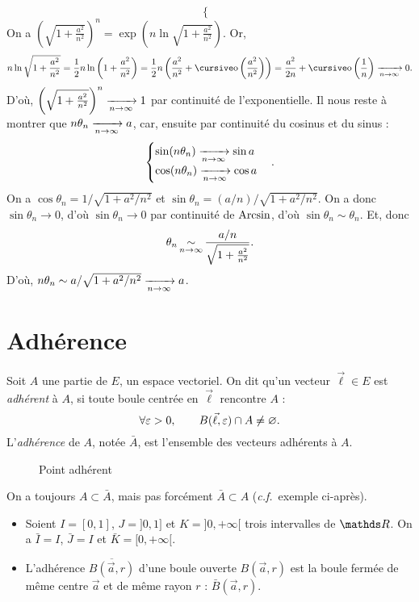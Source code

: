 \begin{exo}
\[\begin{cases}
		\end{cases}
	\]
	On a $\left( \sqrt{1 + \frac{a^2}{n^2}} \right)^n = \exp\left( n \ln \sqrt{1 + \frac{a^2}{n^2}} \right)$.
	Or, \[
		n \ln \sqrt{1 + \frac{a^2}{n^2}}  = \frac{1}{2} n \ln \left(1 + \frac{a^2}{n^2}\right) = \frac{1}{2}n\left( \frac{a^2}{n^2} + \po\left( \frac{a^2}{n^2} \right)\right) = \frac{a^2}{2n} + \po\left( \frac{1}{n} \right) \tendsto{n\to \infty} 0
	.\] D'où, $\left( \sqrt{1 + \frac{a^2}{n^2}}\right)^n \xrightarrow[n\to \infty]{} 1$\/ par continuité de l'exponentielle.
	Il nous reste à montrer que $n \theta_n \xrightarrow[n\to \infty]{} a$, car, ensuite par continuité du cosinus et du sinus : \[
		\begin{cases}
			\sin(n \theta_n) \xrightarrow[n\to \infty]{} \sin a\\
			\cos (n \theta_n) \xrightarrow[n\to \infty]{} \cos a
		\end{cases}
	.\]
	On a $\cos \theta_n = 1 / \sqrt{1 + a^2 / n^2}$\/ et $\sin \theta_n = (a / n) / \sqrt{1 + a^2 / n^2}$. On a donc $\sin \theta_n \to 0$, d'où $\sin \theta_n \to 0$\/ par continuité de $\operatorname{Arcsin}$, d'où $\sin \theta_n \sim \theta_n$.
	Et, donc \[
		\theta_n \operatorname*{\sim}_{n\to \infty} \frac{a/n}{\sqrt{1 + \frac{a^2}{n^2}}}
	.\] D'où, $n \theta_n \sim a / \sqrt{1 + a^2 / n^2} \xrightarrow[n\to \infty]{} a$.
\end{exo}

\section{Adhérence}

\begin{defn}
	Soit $A$\/ une partie de $E$, un espace vectoriel. On dit qu'un vecteur $\vec{\ell} \in E$\/ est \textit{adhérent} à $A$, si toute boule centrée en $\vec{\ell}$\/ rencontre $A$\/ : \[
		\forall \varepsilon > 0,\quad\quad B(\vec{\ell},\varepsilon) \cap A \neq \varnothing
	.\] L'\textit{adhérence} de $A$, notée $\bar{A}$, est l'ensemble des vecteurs adhérents à $A$.
\end{defn}

\begin{figure}[H]
	\centering
	\caption{Point adhérent}
\end{figure}

On a toujours $A\subset \bar{A}$, mais pas forcément $\bar{A} \subset  A$ (\textit{c.f.}\ exemple ci-après).

\begin{exm}
	\begin{itemize}
		\item Soient $I = [0, 1]$, $J = {]0,1]}$\/ et $K = {]0,+\infty[}$\/ trois intervalles de $\R$.
			On a $\bar{I} = I$, $\bar{J} = I$\/ et $\bar{K} = [0, +\infty[$.
		\item L'adhérence $\overline{B(\vec{a},r)}$\/ d'une boule ouverte $B(\vec{a}, r)$\/ est la boule fermée de même centre $\vec{a}$\/ et de même rayon $r$ : $\bar{B}(\vec{a}, r)$.
	\end{itemize}
\end{exm}

